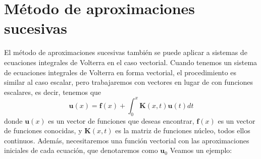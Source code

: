 \section{Método de aproximaciones sucesivas}
El método de aproximaciones sucesivas también se puede aplicar a sistemas de ecuaciones integrales de Volterra en el caso vectorial. Cuando tenemos un sistema de ecuaciones integrales de Volterra en forma vectorial, el procedimiento es similar al caso escalar, pero trabajaremos con vectores en lugar de con funciones escalares, es decir, tenemos que
\begin{equation}
	\textbf{u}(x) = \textbf{f}(x) + \int_0^x \textbf{K}(x,t)\textbf{u}(t)dt
\end{equation}
donde $\textbf{u}(x)$ es un vector de funciones que deseas encontrar, $\textbf{f}(x)$ es un vector de funciones conocidas, y $\textbf{K}(x,t)$ es la matriz de funciones núcleo, todos ellos continuos. Además, necesitaremos una función vectorial con las aproximaciones iniciales de cada ecuación, que denotaremos como $\textbf{u}_0$ Veamos un ejemplo:
